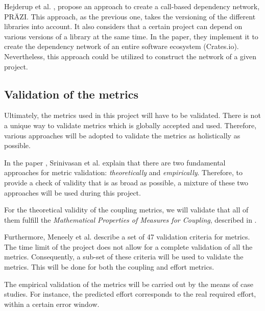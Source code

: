  Hejderup et al. \cite{hejderup2018prazi}, propose an approach to create a call-based dependency network, PRÄZI. This approach, as the previous one, takes the versioning of the different libraries into account. It also considers that a certain project can depend on various versions of a library at the same time. In the paper, they implement it to create the dependency network of an entire software ecosystem (Crates.io). Nevertheless, this approach could be utilized to construct the network of a given project.

\subsection{Validation of the metrics}
Ultimately, the metrics used in this project will have to be validated. There is not a unique way to validate metrics which is globally accepted and used. Therefore, various approaches will be adopted to validate the metrics as holistically as possible.

In the paper \cite{srinivasan2014software}, Srinivasan et al. explain that there are two fundamental approaches for metric validation: \textit{theoretically} and \textit{empirically}. Therefore, to provide a check of validity that is as broad as possible, a mixture of these two approaches will be used during this project.

For the theoretical validity of the coupling metrics, we will validate that all of them fulfill the \textit{Mathematical Properties of Measures for Coupling}, described in \cite{srinivasan2014software}.

Furthermore, Meneely et al. \cite{meneely2013validating} describe a set of 47 validation criteria for metrics. The time limit of the project does not allow for a complete validation of all the metrics. Consequently, a sub-set of these criteria will be used to validate the metrics. This will be done for both the coupling and effort metrics.

The empirical validation of the metrics will be carried out by the means of case studies. For instance, the predicted effort corresponds to the real required effort, within a certain error window.
